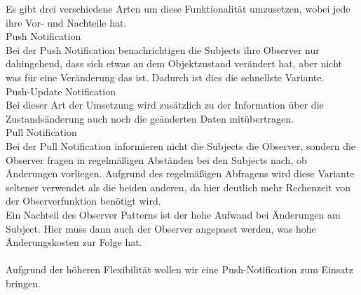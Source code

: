 Es gibt drei verschiedene Arten um diese Funktionalität umzusetzen, wobei jede ihre Vor- und 
Nachteile hat.\\ 
\newline
Push Notification\\
Bei der Push Notification benachrichtigen die Subjects ihre Observer nur dahingehend, dass 
sich etwas an dem Objektzustand verändert hat, aber nicht was für eine Veränderung das ist. 
Dadurch ist dies die schnellste Variante.\\
\newline
Push-Update Notification\\
Bei dieser Art der Umsetzung wird zusätzlich zu der Information über die Zustandsänderung
auch noch die geänderten Daten mitübertragen.\\
\newline
Pull Notification\\
Bei der Pull Notification informieren nicht die Subjects die Observer, sondern die Observer 
fragen in regelmäßigen Abständen bei den Subjects nach, ob Änderungen vorliegen.
Aufgrund des regelmäßigen Abfragens wird diese Variante seltener verwendet als die beiden anderen, da hier 
deutlich mehr Rechenzeit von der Observerfunktion benötigt wird.\\
\newline
Ein Nachteil des Observer Patterns ist der hohe Aufwand bei Änderungen am
Subject. Hier muss dann auch der Observer angepasst werden, was hohe Änderungskosten zur
Folge hat.\cite{wikiObserver}\\\\
Aufgrund der höheren Flexibilität wollen wir eine Push-Notification zum Einsatz bringen.

